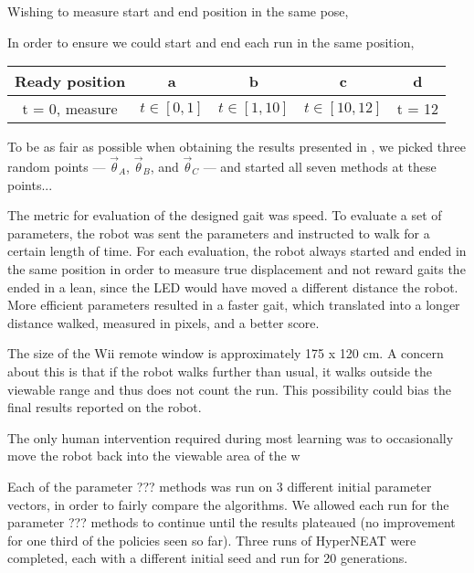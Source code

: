 Wishing to measure start and end position in the same pose, 

In order to ensure we could
start and end each run in the same position,


\begin{tabular}{ccccc}
Ready position & a & b & c & d\\
\hline
t = 0, measure  & $t \in [0,1]$ & $t \in [1,10]$ & $t \in [10,12]$ & t = 12
\end{tabular}





To be as fair as possible when obtaining the results presented in
, we picked three random points --- $\vec{\theta}_A$,
$\vec{\theta}_B$, and $\vec{\theta}_C$ --- and started all seven
methods at these points...



The metric for evaluation of the designed gait was speed. To evaluate
a set of parameters, the robot was sent the parameters and instructed
to walk for a certain length of time. For each evaluation, the robot
always started and ended in the same position in order to measure true
displacement and not reward gaits the ended in a lean, since the LED
would have moved a different distance the robot. More efficient
parameters resulted in a faster gait, which translated into a longer
distance walked, measured in pixels, and a better score.

The size of the Wii remote window is approximately 175 x 120 cm. A
concern about this is that if the robot walks further than usual,
it walks outside the viewable range and thus does not count the run.
This possibility could bias the final results reported on the robot.

The only human intervention required during most learning was to
occasionally move the robot back into the viewable area of the w


Each of the parameter ??? methods was run on 3 different initial
parameter vectors, in order to fairly compare the algorithms. We allowed 
each run for the parameter ??? methods to
continue until the results plateaued (no improvement for one third of
the policies seen so far). Three runs of HyperNEAT were completed,
each with a different initial seed and run for 20 generations.
